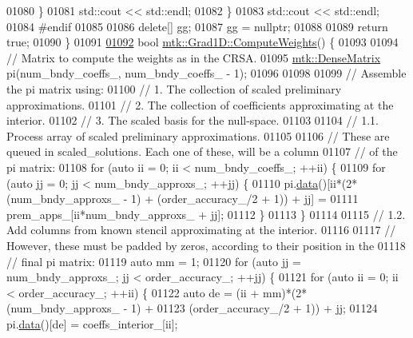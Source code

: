 \begin{DoxyCode}
{{01080     \}
01081     std::cout << std::endl;
01082   \}
01083   std::cout << std::endl;
01084 \textcolor{preprocessor}{  #endif}
01085 
01086   \textcolor{keyword}{delete}[] gg;
01087   gg = \textcolor{keyword}{nullptr};
01088 
01089   \textcolor{keywordflow}{return} \textcolor{keyword}{true};
01090 \}
01091 
\hypertarget{mtk__grad__1d_8cc_source_l01092}{}\hyperlink{classmtk_1_1Grad1D_a224082617751864bffca9bfe494c36d5}{01092} \textcolor{keywordtype}{bool} \hyperlink{classmtk_1_1Grad1D_a224082617751864bffca9bfe494c36d5}{mtk::Grad1D::ComputeWeights}() \{
01093 
01094   \textcolor{comment}{// Matrix to compute the weights as in the CRSA.}
01095   \hyperlink{classmtk_1_1DenseMatrix}{mtk::DenseMatrix} pi(num\_bndy\_coeffs\_, num\_bndy\_coeffs\_ - 1);
01096 
01098 
01099   \textcolor{comment}{// Assemble the pi matrix using:}
01100   \textcolor{comment}{// 1. The collection of scaled preliminary approximations.}
01101   \textcolor{comment}{// 2. The collection of coefficients approximating at the interior.}
01102   \textcolor{comment}{// 3. The scaled basis for the null-space.}
01103 
01104   \textcolor{comment}{// 1.1. Process array of scaled preliminary approximations.}
01105 
01106   \textcolor{comment}{// These are queued in scaled\_solutions. Each one of these, will be a column}
01107   \textcolor{comment}{// of the pi matrix:}
01108   \textcolor{keywordflow}{for} (\textcolor{keyword}{auto} ii = 0; ii < num\_bndy\_coeffs\_; ++ii) \{
01109     \textcolor{keywordflow}{for} (\textcolor{keyword}{auto} jj = 0; jj < num\_bndy\_approxs\_; ++jj) \{
01110       pi.\hyperlink{classmtk_1_1DenseMatrix_a0c33b8a9e01d157c61ddbdf807c25d84}{data}()[ii*(2*(num\_bndy\_approxs\_ - 1) + (order\_accuracy\_/2 + 1)) + jj] =
01111         prem\_apps\_[ii*num\_bndy\_approxs\_ + jj];
01112     \}
01113   \}
01114 
01115   \textcolor{comment}{// 1.2. Add columns from known stencil approximating at the interior.}
01116 
01117   \textcolor{comment}{// However, these must be padded by zeros, according to their position in the}
01118   \textcolor{comment}{// final pi matrix:}
01119   \textcolor{keyword}{auto} mm = 1;
01120   \textcolor{keywordflow}{for} (\textcolor{keyword}{auto} jj = num\_bndy\_approxs\_; jj < order\_accuracy\_; ++jj) \{
01121     \textcolor{keywordflow}{for} (\textcolor{keyword}{auto} ii = 0; ii < order\_accuracy\_; ++ii) \{
01122       \textcolor{keyword}{auto} de = (ii + mm)*(2*(num\_bndy\_approxs\_ - 1) +
01123         (order\_accuracy\_/2 + 1)) + jj;
01124       pi.\hyperlink{classmtk_1_1DenseMatrix_a0c33b8a9e01d157c61ddbdf807c25d84}{data}()[de] = coeffs\_interior\_[ii];
}}
\end{DoxyCode}
